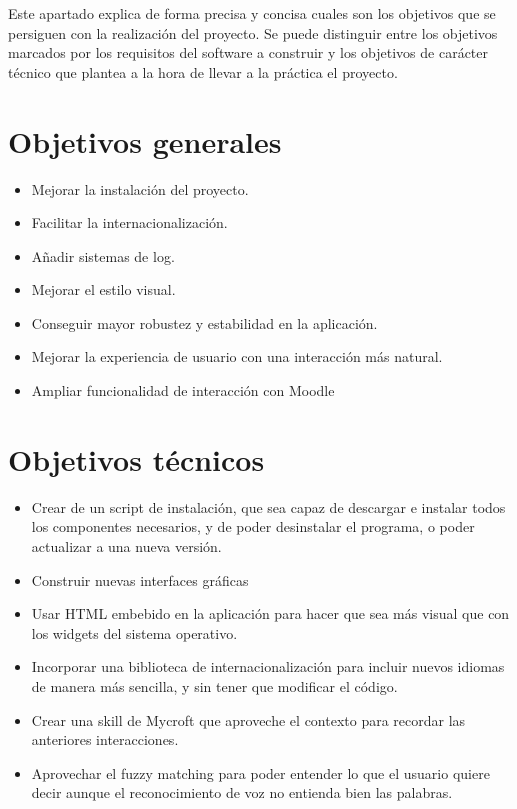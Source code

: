 
Este apartado explica de forma precisa y concisa cuales son los objetivos que se persiguen con la realización del proyecto. Se puede distinguir entre los objetivos marcados por los requisitos del software a construir y los objetivos de carácter técnico que plantea a la hora de llevar a la práctica el proyecto.

\section*{Objetivos generales}
\begin{itemize}
    \item Mejorar la instalación del proyecto.
    \item Facilitar la internacionalización.
    \item Añadir sistemas de log.
    \item Mejorar el estilo visual.
    \item Conseguir mayor robustez y estabilidad en la aplicación.
    \item Mejorar la experiencia de usuario con una interacción más natural.
    \item Ampliar funcionalidad de interacción con Moodle
\end{itemize}

\section*{Objetivos técnicos}
\begin{itemize}
    \item Crear de un script de instalación, que sea capaz de descargar e instalar todos los componentes necesarios, y de poder desinstalar el programa, o poder actualizar a una nueva versión.
    \item Construir nuevas interfaces gráficas
    \item Usar HTML embebido en la aplicación para hacer que sea más visual que con los widgets del sistema operativo.
    \item Incorporar una biblioteca de internacionalización para incluir nuevos idiomas de manera más sencilla, y sin tener que modificar el código.
    \item Crear una skill de Mycroft que aproveche el contexto para recordar las anteriores interacciones.
    \item Aprovechar el fuzzy matching para poder entender lo que el usuario quiere decir aunque el reconocimiento de voz no entienda bien las palabras.
\end{itemize}

